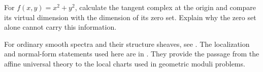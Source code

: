 \begin{exercise}
For $f(x,y)=x^2+y^2$, calculate the tangent complex at the origin
and compare its virtual dimension with the dimension of its zero set.
Explain why the zero set alone cannot carry this information.
\end{exercise}

For ordinary smooth spectra and their structure sheaves, see
\cite[Sections~2.2 and~3.1]{Joyce_Introduction_Cinfty_Schemes}.
The localization and normal-form statements used here are in
\cite[Sections~4.1.3 and~5.1.1]{Steffens_Derived_Differential_Geometry}.
They provide the passage from the affine universal theory to the
local charts used in geometric moduli problems.
